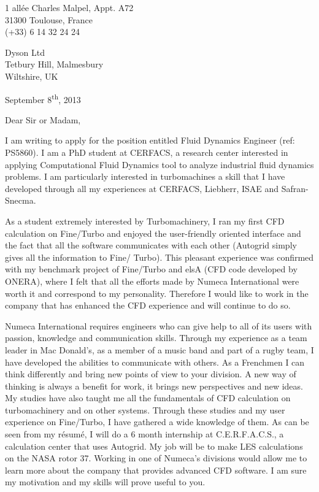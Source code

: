 \documentclass[11pt]{article}
\begin{document}
\begin{flushright}
	1 allée Charles Malpel, Appt. A72 \\
	31300 Toulouse, France \\
	(+33) 6 14 32 24 24 \\
\end{flushright}

\begin{flushleft}
Dyson Ltd \\
Tetbury Hill, Malmesbury \\
Wiltshire, UK
\end{flushleft}

\begin{flushright}
September 8\textsuperscript{th}, 2013
\end{flushright}

\noindent
Dear Sir or Madam,
\newline

\noindent
I am writing to apply for the position entitled Fluid Dynamics Engineer 
(ref: PS5860).
I am a PhD student at CERFACS, 
a research center interested in applying Computational Fluid Dynamics
tool to analyze industrial fluid dynamics problems.
I am particularly interested in turbomachines
a skill that I have developed through all my 
experiences at CERFACS, Liebherr, ISAE and Safran-Snecma.
\newline

\noindent
As a student extremely interested by Turbomachinery, 
I ran my first CFD calculation on Fine/Turbo and enjoyed the 
user-friendly oriented interface and the fact that all the 
software communicates with each other (Autogrid simply gives 
all the information to Fine/ Turbo). This pleasant experience was 
confirmed with my benchmark project of Fine/Turbo and elsA 
(CFD code developed by ONERA), where I felt that all the efforts 
made by Numeca International were worth it and correspond to my personality. 
Therefore I would like to work in the company that has enhanced 
the CFD experience and will continue to do so.
\newline

\noindent
Numeca International requires engineers who can give 
help to all of its users with passion, knowledge and 
communication skills. Through my experience as a team 
leader in Mac Donald's, as a member of a music band 
and part of a rugby team, I have developed the abilities 
to communicate with others. As a Frenchmen I can think 
differently and bring new points of view to your division. 
A new way of thinking is always a benefit for work, 
it brings new perspectives and new ideas. My studies have 
also taught me all the fundamentals of CFD calculation 
on turbomachinery and on other systems. Through these 
studies and my user experience on Fine/Turbo, I have gathered 
a wide knowledge of them. As can be seen from my résumé, 
I will do a 6 month internship at C.E.R.F.A.C.S., 
a calculation center that uses Autogrid. My job will be 
to make LES calculations on the NASA rotor 37. Working in one 
of Numeca's divisions would allow me to learn more about 
the company that provides advanced CFD software. 
I am sure my motivation and my skills will prove useful to you.
\newline
\end{document}
